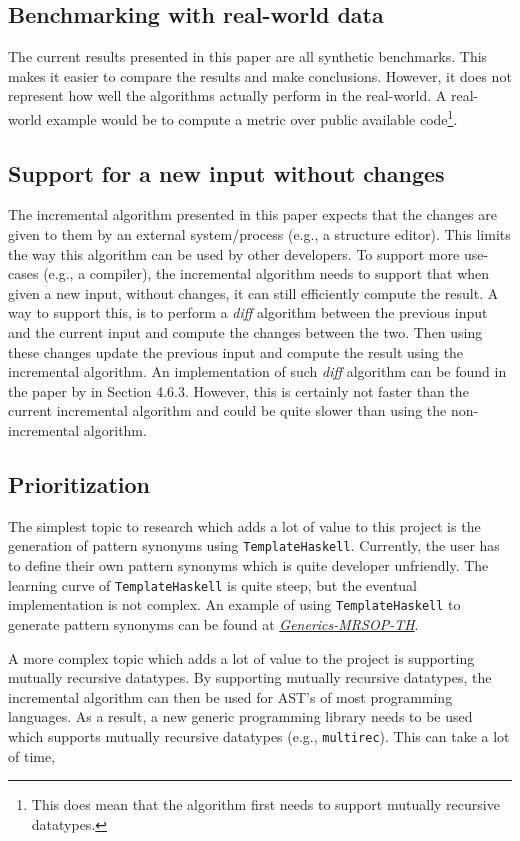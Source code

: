 \subsection{Benchmarking with real-world data}
The current results presented in this paper are all synthetic benchmarks. This makes it easier to compare the results and make conclusions. However, it does not represent how well the algorithms actually perform in the real-world. A real-world example would be to compute a metric over public available code\footnote{This does mean that the algorithm first needs to support mutually recursive datatypes.}.

\subsection{Support for a new input without changes}
The incremental algorithm presented in this paper expects that the changes are given to them by an external system/process (e.g., a structure editor). This limits the way this algorithm can be used by other developers. To support more use-cases (e.g., a compiler), the incremental algorithm needs to support that when given a new input, without changes, it can still efficiently compute the result. A way to support this, is to perform a \textit{diff} algorithm between the previous input and the current input and compute the changes between the two. Then using these changes update the previous input and compute the result using the incremental algorithm. An implementation of such \textit{diff} algorithm can be found in the paper  by \citeauthor{bransen2015incremental} in Section 4.6.3. However, this is certainly not faster than the current incremental algorithm and could be quite slower than using the non-incremental algorithm. 

\subsection{Prioritization}
The simplest topic to research which adds a lot of value to this project is the generation of pattern synonyms using \texttt{TemplateHaskell}. Currently, the user has to define their own pattern synonyms which is quite developer unfriendly. The learning curve of \texttt{TemplateHaskell} is quite steep, but the eventual implementation is not complex. An example of using \texttt{TemplateHaskell} to generate pattern synonyms can be found at \href{https://hackage.haskell.org/package/generics-mrsop-2.3.0/docs/Generics-MRSOP-TH.html}{\textit{Generics-MRSOP-TH}}\cite*{genericsmrsop2022}.

A more complex topic which adds a lot of value to the project is supporting mutually recursive datatypes. By supporting mutually recursive datatypes, the incremental algorithm can then be used for AST's of most programming languages. As a result, a new generic programming library needs to be used which supports mutually recursive datatypes (e.g., \texttt{multirec}\cite*{multirec2022}). This can take a lot of time, 